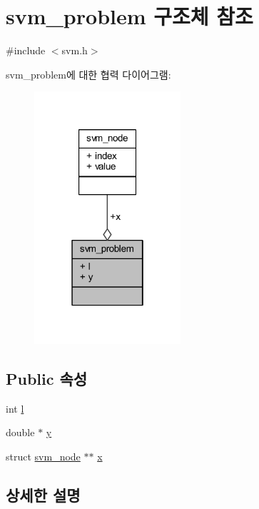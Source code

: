 \hypertarget{structsvm__problem}{\section{svm\+\_\+problem 구조체 참조}
\label{structsvm__problem}
}


{\ttfamily \#include $<$svm.\+h$>$}



svm\+\_\+problem에 대한 협력 다이어그램\+:
\nopagebreak
\begin{figure}[H]
\begin{center}
\leavevmode
\includegraphics[width=154pt]{structsvm__problem__coll__graph}
\end{center}
\end{figure}
\subsection*{Public 속성}
\begin{DoxyCompactItemize}
\item 
int \hyperlink{structsvm__problem_a4350eb6820f0d6126bffb6264cec65b3}{l}
\item 
double $\ast$ \hyperlink{structsvm__problem_a59dec12ff090571bc9592ba9fb306780}{y}
\item 
struct \hyperlink{structsvm__node}{svm\+\_\+node} $\ast$$\ast$ \hyperlink{structsvm__problem_acddda9b49a8e38bbda079f35c2e18984}{x}
\end{DoxyCompactItemize}


\subsection{상세한 설명}


